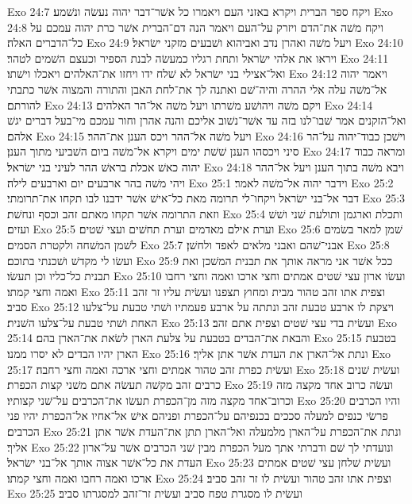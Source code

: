 Exo 24:7  ויקח ספר הברית ויקרא באזני העם ויאמרו כל אשׁר־דבר יהוה נעשׂה ונשׁמע׃
Exo 24:8  ויקח משׁה את־הדם ויזרק על־העם ויאמר הנה דם־הברית אשׁר כרת יהוה עמכם על כל־הדברים האלה׃
Exo 24:9  ויעל משׁה ואהרן נדב ואביהוא ושׁבעים מזקני ישׂראל׃
Exo 24:10  ויראו את אלהי ישׂראל ותחת רגליו כמעשׂה לבנת הספיר וכעצם השׁמים לטהר׃
Exo 24:11  ואל־אצילי בני ישׂראל לא שׁלח ידו ויחזו את־האלהים ויאכלו וישׁתו׃
Exo 24:12  ויאמר יהוה אל־משׁה עלה אלי ההרה והיה־שׁם ואתנה לך את־לחת האבן והתורה והמצוה אשׁר כתבתי להורתם׃
Exo 24:13  ויקם משׁה ויהושׁע משׁרתו ויעל משׁה אל־הר האלהים׃
Exo 24:14  ואל־הזקנים אמר שׁבו־לנו בזה עד אשׁר־נשׁוב אליכם והנה אהרן וחור עמכם מי־בעל דברים יגשׁ אלהם׃
Exo 24:15  ויעל משׁה אל־ההר ויכס הענן את־ההר׃
Exo 24:16  וישׁכן כבוד־יהוה על־הר סיני ויכסהו הענן שׁשׁת ימים ויקרא אל־משׁה ביום השׁביעי מתוך הענן׃
Exo 24:17  ומראה כבוד יהוה כאשׁ אכלת בראשׁ ההר לעיני בני ישׂראל׃
Exo 24:18  ויבא משׁה בתוך הענן ויעל אל־ההר ויהי משׁה בהר ארבעים יום וארבעים לילה׃
Exo 25:1  וידבר יהוה אל־משׁה לאמר׃
Exo 25:2  דבר אל־בני ישׂראל ויקחו־לי תרומה מאת כל־אישׁ אשׁר ידבנו לבו תקחו את־תרומתי׃
Exo 25:3  וזאת התרומה אשׁר תקחו מאתם זהב וכסף ונחשׁת׃
Exo 25:4  ותכלת וארגמן ותולעת שׁני ושׁשׁ ועזים׃
Exo 25:5  וערת אילם מאדמים וערת תחשׁים ועצי שׁטים׃
Exo 25:6  שׁמן למאר בשׂמים לשׁמן המשׁחה ולקטרת הסמים׃
Exo 25:7  אבני־שׁהם ואבני מלאים לאפד ולחשׁן׃
Exo 25:8  ועשׂו לי מקדשׁ ושׁכנתי בתוכם׃
Exo 25:9  ככל אשׁר אני מראה אותך את תבנית המשׁכן ואת תבנית כל־כליו וכן תעשׂו׃
Exo 25:10  ועשׂו ארון עצי שׁטים אמתים וחצי ארכו ואמה וחצי רחבו ואמה וחצי קמתו׃
Exo 25:11  וצפית אתו זהב טהור מבית ומחוץ תצפנו ועשׂית עליו זר זהב סביב׃
Exo 25:12  ויצקת לו ארבע טבעת זהב ונתתה על ארבע פעמתיו ושׁתי טבעת על־צלעו האחת ושׁתי טבעת על־צלעו השׁנית׃
Exo 25:13  ועשׂית בדי עצי שׁטים וצפית אתם זהב׃
Exo 25:14  והבאת את־הבדים בטבעת על צלעת הארן לשׂאת את־הארן בהם׃
Exo 25:15  בטבעת הארן יהיו הבדים לא יסרו ממנו׃
Exo 25:16  ונתת אל־הארן את העדת אשׁר אתן אליך׃
Exo 25:17  ועשׂית כפרת זהב טהור אמתים וחצי ארכה ואמה וחצי רחבה׃
Exo 25:18  ועשׂית שׁנים כרבים זהב מקשׁה תעשׂה אתם משׁני קצות הכפרת׃
Exo 25:19  ועשׂה כרוב אחד מקצה מזה וכרוב־אחד מקצה מזה מן־הכפרת תעשׂו את־הכרבים על־שׁני קצותיו׃
Exo 25:20  והיו הכרבים פרשׂי כנפים למעלה סככים בכנפיהם על־הכפרת ופניהם אישׁ אל־אחיו אל־הכפרת יהיו פני הכרבים׃
Exo 25:21  ונתת את־הכפרת על־הארן מלמעלה ואל־הארן תתן את־העדת אשׁר אתן אליך׃
Exo 25:22  ונועדתי לך שׁם ודברתי אתך מעל הכפרת מבין שׁני הכרבים אשׁר על־ארון העדת את כל־אשׁר אצוה אותך אל־בני ישׂראל׃
Exo 25:23  ועשׂית שׁלחן עצי שׁטים אמתים ארכו ואמה רחבו ואמה וחצי קמתו׃
Exo 25:24  וצפית אתו זהב טהור ועשׂית לו זר זהב סביב׃
Exo 25:25  ועשׂית לו מסגרת טפח סביב ועשׂית זר־זהב למסגרתו סביב׃
